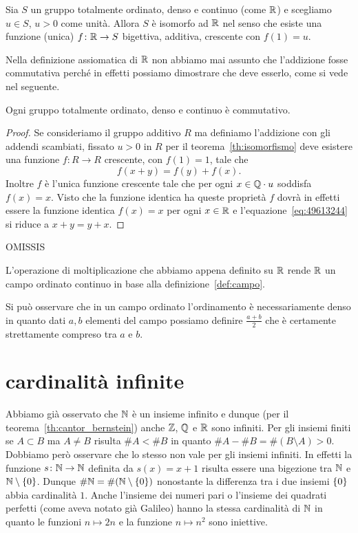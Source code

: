 \begin{corollary}[unicità di $\RR$]%
  \label{th:unicitaR}%
  Sia $S$ un gruppo totalmente ordinato, denso e continuo (come $\RR$)
  e scegliamo $u\in S$, $u>0$ come unità.
  Allora $S$ è isomorfo ad $\RR$ nel senso che esiste una funzione (unica)
  $f\colon {\mathbb R}\to S$ bigettiva, additiva, crescente con $f(1)=u$.
\end{corollary}

Nella definizione assiomatica di $\RR$ non abbiamo mai assunto che l'addizione fosse 
commutativa perché in effetti possiamo dimostrare che deve esserlo, come si vede nel seguente.
\begin{theorem}
Ogni gruppo totalmente ordinato, denso e continuo 
è commutativo.
\end{theorem}
%
\begin{proof}
Se consideriamo il gruppo additivo $R$ ma definiamo 
l'addizione con gli addendi scambiati, 
fissato $u>0$ in $R$
per il teorema~\ref{th:isomorfismo}
deve esistere una funzione $f\colon R\to R$ crescente, con $f(1)=1$, tale che 
\begin{equation}\label{eq:49613244}
  f(x+y) = f(y)+f(x).
\end{equation}
Inoltre $f$ è l'unica funzione crescente tale che 
per ogni $x\in {\mathbb Q}\cdot u$ soddisfa $f(x)=x$. 
Visto che la funzione identica ha queste proprietà 
$f$ dovrà in effetti essere la funzione identica $f(x)=x$ 
per ogni $x\in {\mathbb R}$ 
e l'equazione~\eqref{eq:49613244} si riduce a $x+y=y+x$.
\end{proof}

OMISSIS

L'operazione di moltiplicazione che abbiamo appena definito su $\RR$ 
rende $\RR$ un campo ordinato continuo in base alla definizione~\ref{def:campo}.

Si può osservare che in un campo ordinato l'ordinamento 
è necessariamente denso in quanto dati $a,b$ elementi 
del campo possiamo definire $\frac{a+b}{2}$ che è certamente 
strettamente compreso tra $a$ e $b$.

\section{cardinalità infinite}

Abbiamo già osservato che ${\mathbb N}$ è un insieme infinito e dunque (per il teorema~\ref{th:cantor_bernstein})
anche ${\mathbb Z}$, ${\mathbb Q}$ e $\RR$ sono infiniti.
Per gli insiemi finiti se $A\subset B$ ma $A\neq B$ risulta $\#A < \# B$
in quanto $\#A - \#B = \#(B\setminus A) > 0$. 
Dobbiamo però osservare che lo stesso non vale per gli insiemi infiniti.
In effetti la funzione $s\colon {\mathbb N} \to {\mathbb N}$ definita da $s(x)=x+1$
risulta essere una bigezione tra ${\mathbb N}$ e ${\mathbb N}\setminus{\left\{ 0 \right\}}$. 
Dunque $\#{\mathbb N} = \#({\mathbb N}\setminus{\left\{ 0 \right\}})$ 
nonostante la differenza tra i due insiemi ${\left\{ 0 \right\}}$ abbia 
cardinalità $1$. 
Anche l'insieme dei numeri pari o l'insieme 
dei quadrati perfetti (come aveva notato già Galileo)
hanno la stessa cardinalità di ${\mathbb N}$ in quanto le funzioni $n\mapsto 2n$
e la funzione $n\mapsto n^2$ sono iniettive.


